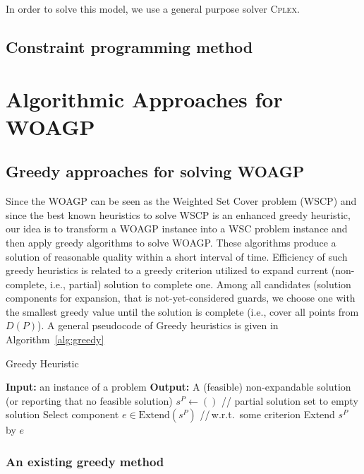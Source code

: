 \documentclass[runningheads,a4paper]{elsarticle}
\begin{document}
      In order to solve this model, we use a general purpose solver \textsc{Cplex}.
       \subsection{Constraint programming method}

     \section{Algorithmic Approaches for WOAGP}
     \subsection{Greedy approaches for solving WOAGP}
      Since the WOAGP can be seen as the Weighted Set Cover problem (WSCP) and since the best known heuristics to solve WSCP is an enhanced greedy heuristic, our idea is to transform a WOAGP instance into a WSC problem instance and then
          apply greedy algorithms to solve WOAGP. These algorithms produce a solution of reasonable quality within a short interval of time. Efficiency of such greedy heuristics is related to a greedy criterion utilized to expand current (non-complete, i.e., partial) solution to complete one. Among all candidates (solution components for expansion, that is not-yet-considered guards, we choose one with the smallest greedy value until the solution is complete (i.e., cover all  points from $D(P)$).
          A general pseudocode of Greedy heuristics is given in Algorithm~\ref{alg:greedy}

          \begin{algorithm}[!t]
          	\caption{Greedy Heuristic}\label{alg:greedy}
          	\begin{algorithmic}[1]
          		\State \textbf{Input:} an instance of a problem
          		\State \textbf{Output:} A (feasible) non-expandable solution (or reporting that no feasible solution)
          		\State $s^{P} \gets ()$ \hspace{0.3cm}// partial solution set to empty solution
          		\State Select component $e \in  \text{Extend}(s^{P})$ \hspace{0.3cm}//\,w.r.t.\  some criterion
          		\State Extend $s^{P}$ by $e$
          		\EndWhile
          	\end{algorithmic}
          \end{algorithm}
     \subsubsection{An existing greedy method}
         
\end{document}
